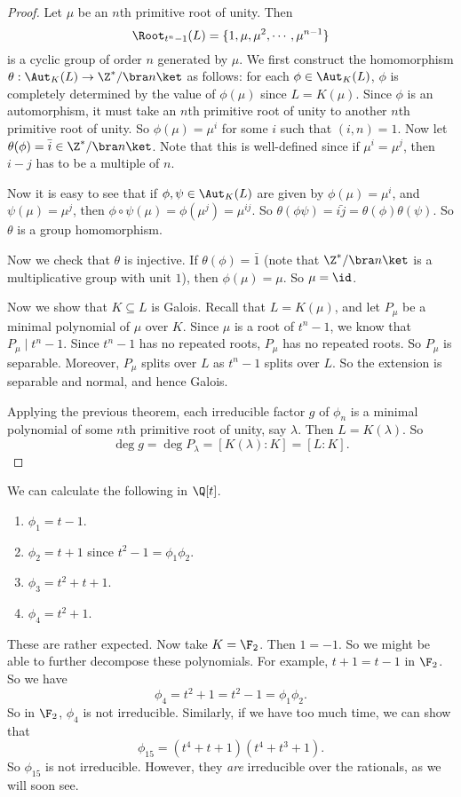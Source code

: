 \documentclass[a4paper]{article}
\begin{document}
\begin{proof}
  Let $\mu$ be an $n$th primitive root of unity. Then
  \[
    \Root_{t^n - 1}(L) = \{1, \mu, \mu^2, \cdots, \mu^{n - 1}\}
  \]
  is a cyclic group of order $n$ generated by $\mu$. We first construct the homomorphism $\theta: \Aut_K(L) \to \Z^*/\bra n\ket$ as follows: for each $\phi \in \Aut_K(L)$, $\phi$ is completely determined by the value of $\phi(\mu)$ since $L = K(\mu)$. Since $\phi$ is an automorphism, it must take an $n$th primitive root of unity to another $n$th primitive root of unity. So $\phi(\mu) = \mu^i$ for some $i$ such that $(i, n) = 1$. Now let $\theta(\phi) = \bar{i} \in \Z^*/\bra n\ket$. Note that this is well-defined since if $\mu^i = \mu^j$, then $i - j$ has to be a multiple of $n$.

  Now it is easy to see that if $\phi, \psi \in \Aut_K(L)$ are given by $\phi(\mu) = \mu^i$, and $\psi(\mu) = \mu^j$, then $\phi\circ \psi(\mu) = \phi(\mu^j) = \mu^{ij}$. So $\theta(\phi \psi) = \bar{ij} = \theta(\phi)\theta(\psi)$. So $\theta$ is a group homomorphism.

  Now we check that $\theta$ is injective. If $\theta(\phi) = \bar{1}$ (note that $\Z^*/\bra n\ket$ is a multiplicative group with unit $1$), then $\phi(\mu) = \mu$. So $\mu = \id$.

  Now we show that $K\subseteq L$ is Galois. Recall that $L = K(\mu)$, and let $P_\mu$ be a minimal polynomial of $\mu$ over $K$. Since $\mu$ is a root of $t^n - 1$, we know that $P_\mu \mid t^n - 1$. Since $t^n - 1$ has no repeated roots, $P_\mu$ has no repeated roots. So $P_\mu$ is separable. Moreover, $P_\mu$ splits over $L$ as $t^n - 1$ splits over $L$. So the extension is separable and normal, and hence Galois.

  Applying the previous theorem, each irreducible factor $g$ of $\phi_n$ is a minimal polynomial of some $n$th primitive root of unity, say $\lambda$. Then $L = K(\lambda)$. So
  \[
    \deg g = \deg P_\lambda = [K(\lambda): K] = [L:K].
  \]
\end{proof}

\begin{eg}
  We can calculate the following in $\Q[t]$.
  \begin{enumerate}
    \item $\phi_1 = t - 1$.
    \item $\phi_2 = t + 1$ since $t^2 - 1 = \phi_1 \phi_2$.
    \item $\phi_3 = t^2 + t + 1$.
    \item $\phi_4 = t^2 + 1$.
  \end{enumerate}
  These are rather expected. Now take $K = \F_2$. Then $1 = -1$. So we might be able to further decompose these polynomials. For example, $t + 1 = t - 1$ in $\F_2$. So we have
  \[
    \phi_4 = t^2 + 1 = t^2 - 1 = \phi_1 \phi_2.
  \]
  So in $\F_2$, $\phi_4$ is not irreducible. Similarly, if we have too much time, we can show that
  \[
    \phi_{15} = (t^4 + t + 1)(t^4 + t^3 + 1).
  \]
  So $\phi_{15}$ is not irreducible. However, they \emph{are} irreducible over the rationals, as we will soon see.
\end{eg}
\end{document}
